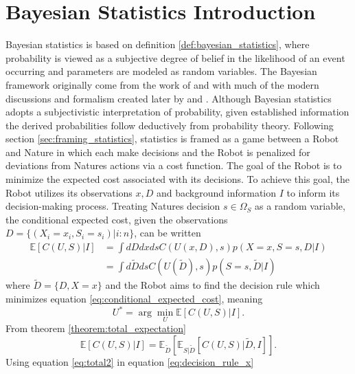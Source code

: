 \chapter{Bayesian Statistics Introduction}
Bayesian statistics is based on definition \ref{def:bayesian_statistics}, where probability is viewed as a subjective degree of belief in the likelihood of an event occurring and parameters are modeled as random variables. The Bayesian framework originally come from the work of \citet{Bayes:63} and \citet{laplace_thorie_1812} with much of the modern discussions and formalism created later by \citet{Finetti1937LaP,Jeffreys1940} and \citet{Savage1954}. Although Bayesian statistics adopts a subjectivistic interpretation of probability, given established information the derived probabilities follow deductively from probability theory. \newline
Following section \ref{sec:framing_statistics}, statistics is framed as a game between a Robot and Nature in which each make decisions and the Robot is penalized for deviations from Natures actions via a cost function. The goal of the Robot is to minimize the expected cost associated with its decisions. To achieve this goal, the Robot utilizes its observations $x,D$ and background information $I$ to inform its decision-making process. Treating Natures decision $s\in \Omega_S$ as a random variable, the conditional expected cost, given the observations $D =\{(X_i=x_i, S_i = s_i)|i:n \}$, can be written~\cite{murphy2023probabilistic}
\begin{equation}
	\begin{split}
		\mathbb{E}[C(U, S)|I] &= \int dD dx ds  C(U(x,D),s) p(X=x,S=s,D|I)\\
		& = \int d\tilde{D} ds  C(U(\tilde{D}),s) p(S=s,\tilde{D}|I)
	\end{split}
	\label{eq:conditional_expected_cost}
\end{equation}
where $\tilde{D} = \{D,X= x\}$ and the Robot aims to find the decision rule which minimizes equation \eqref{eq:conditional_expected_cost}, meaning
\begin{equation}
	U^* = \arg\min_{U} \mathbb{E}[C(U, S)|I].
	\label{eq:decision_rule_x}
\end{equation}	
From theorem \ref{theorem:total_expectation}
\begin{equation}
	\mathbb{E}[C(U, S)|I] = \mathbb{E}_{\tilde{D}}[\mathbb{E}_{S|\tilde{D}}[C(U, S)|\tilde{D},I]].
	\label{eq:total2}
\end{equation}
Using equation \eqref{eq:total2} in equation \eqref{eq:decision_rule_x}
